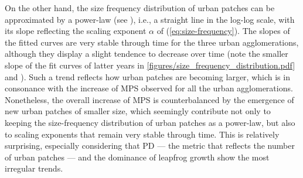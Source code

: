 \documentclass[10pt,letterpaper]{article}
\begin{document}


On the other hand, the size frequency distribution of urban patches can be approximated by a power-law (see ), i.e., a straight line in the log-log scale, with its slope reflecting the scaling exponent $\alpha$ of (\ref{eq:size-frequency}). The slopes of the fitted curves are very stable through time for the three urban agglomerations, although they display a slight tendence to decrease over time (note the smaller slope of the fit curves of latter years in \autoref{figures/size_frequency_distribution.pdf} and ).
Such a trend reflects how urban patches are becoming larger, which is in consonance with the increase of MPS observed for all the urban agglomerations.
Nonetheless, the overall increase of MPS is counterbalanced by the emergence of new urban patches of smaller size, which seemingly contribute not only to keeping the size-frequency distribution of urban patches as a power-law, but also to scaling exponents that remain very stable through time. This is relatively surprising, especially considering that PD --- the metric that reflects the number of urban patches --- and the dominance of leapfrog growth show the most irregular trends.
\end{document}
